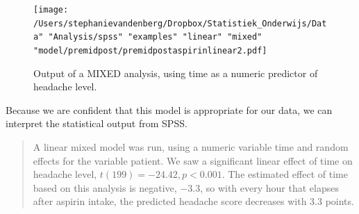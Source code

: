 \documentclass[]{book}\usepackage[]{graphicx}\usepackage[]{color}
\begin{document}
\begin{figure}[h]
    \begin{center}
       \texttt{[image: /Users/stephanievandenberg/Dropbox/Statistiek\_Onderwijs/Data" "Analysis/spss" "examples" "linear" "mixed" "model/premidpost/premidpostaspirinlinear2.pdf]}
    \end{center}
    \label{fig:premidpostaspirinlinear2}
    \caption{Output of a MIXED analysis, using time as a numeric predictor of headache level.}
\end{figure}


Because we are confident that this model is appropriate for our data, we can interpret the statistical output from SPSS. 

\begin{quotation}
A linear mixed model was run, using a numeric variable time and random effects for the variable patient. We saw a significant linear effect of time on headache level, $t(199)=-24.42, p < 0.001$. The estimated effect of time based on this analysis is negative, $-3.3$, so with every hour that elapses after aspirin intake, the predicted headache score decreases with 3.3 points. 
\end{quotation}
\end{document}

